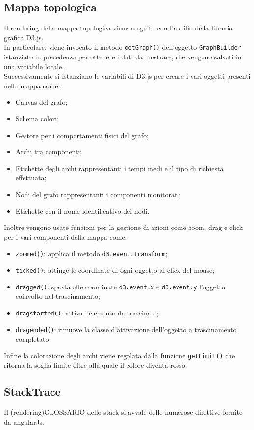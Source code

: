 \subsection{Mappa topologica}
Il rendering della mappa topologica viene eseguito con l'ausilio della libreria grafica D3.js. \\
In particolare, viene invocato il metodo \texttt{getGraph()} dell'oggetto \texttt{GraphBuilder} istanziato in precedenza per ottenere i dati da mostrare, che vengono salvati in una variabile locale. \\
Successivamente si istanziano le variabili di D3.js per creare i vari oggetti presenti nella mappa come:
\begin{itemize}
	\item Canvas del grafo;
	\item Schema colori;
	\item Gestore per i comportamenti fisici del grafo;
	\item Archi tra componenti;
	\item Etichette degli archi rappresentanti i tempi medi e il tipo di richiesta effettuata;
	\item Nodi del grafo rappresentanti i componenti monitorati;
	\item Etichette con il nome identificativo dei nodi.
\end{itemize}
Inoltre vengono usate funzioni per la gestione di azioni come zoom, drag e click per i vari componenti della mappa come:
\begin{itemize}
	\item \texttt{zoomed()}: applica il metodo \texttt{d3.event.transform};
	\item \texttt{ticked()}: attinge le coordinate di ogni oggetto al click del mouse;
	\item \texttt{dragged()}: sposta alle coordinate \texttt{d3.event.x} e \texttt{d3.event.y} l'oggetto coinvolto nel trascinamento;
	\item \texttt{dragstarted()}: attiva l'elemento da trascinare;
	\item \texttt{dragended()}: rimuove la classe d'attivazione dell'oggetto a trascinamento completato.
\end{itemize}
Infine la colorazione degli archi viene regolata dalla funzione \texttt{getLimit()} che ritorna la soglia limite oltre alla quale il colore diventa rosso.
\subsection{StackTrace}
	Il (rendering)GLOSSARIO dello stack si avvale delle numerose direttive fornite da
angularJs.


